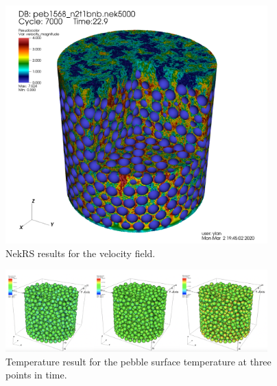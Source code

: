 \begin{figure}[!h]
\centering
\includegraphics[clip=true,width=0.9\textwidth]{Figures/ndemo_r3}
\caption{NekRS results for the velocity field.}
\label{f:ndemo3}
\end{figure}


\begin{figure}[!h]
\centering
\includegraphics[clip=true,width=0.9\textwidth]{Figures/ndemo_r4}
\caption{Temperature result for the pebble surface temperature at three points in time.}
\label{f:ndemo4}
\end{figure}

